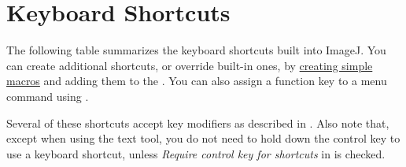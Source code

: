
\part{Keyboard Shortcuts\label{sec:Keyboard-Shortcuts}}

The following table summarizes the keyboard shortcuts
built into ImageJ. You can create additional shortcuts, or override
built-in ones, by \href{http://imagej.nih.gov/ij/developer/macro/macros.html\#shortcuts}{creating simple macros}
and adding them to the . You can also
assign a function key to a menu command using \textsf{}. 

Several of these shortcuts accept key modifiers as described in .
Also note that, except when using the text tool, you do not need to
hold down the control key to use a keyboard shortcut, unless \emph{Require
control key for shortcuts }in \textsf{}
is checked.



\begingroup
\small
\renewcommand{\tabcolsep}{4pt}%
\renewcommand\arraystretch{1.08} %

